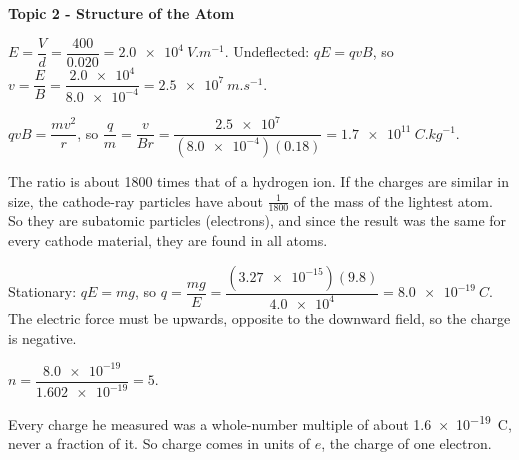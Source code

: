 \documentclass[12pt]{article}
\newcommand\anstopic[1]{\par\Needspace{8\baselineskip}\vspace{4mm}%
  \begin{center}{\headfont\bfseries\fontsize{14}{18}\selectfont #1\par}\end{center}\vspace{2pt}}
\begin{document}
\anstopic{Topic 2 - Structure of the Atom}

\ansq
{}
\begin{crit}
\end{crit}
\sample
$E = \dfrac{V}{d} = \dfrac{400}{0.020} = \qty{2.0e4}{V.m^{-1}}$. Undeflected: $qE = qvB$, so
$v = \dfrac{E}{B} = \dfrac{\num{2.0e4}}{\num{8.0e-4}} = \qty{2.5e7}{m.s^{-1}}$.
\begin{crit}
\end{crit}
\sample
$qvB = \dfrac{mv^2}{r}$, so $\dfrac{q}{m} = \dfrac{v}{Br} = \dfrac{\num{2.5e7}}{(\num{8.0e-4})(0.18)}
= \qty{1.7e11}{C.kg^{-1}}$.
\begin{crit}
\end{crit}
\sample
The ratio is about 1800 times that of a hydrogen ion. If the charges are similar in size, the cathode-ray
particles have about $\frac{1}{1800}$ of the mass of the lightest atom. So they are subatomic particles
(electrons), and since the result was the same for every cathode material, they are found in all atoms.

\ansq
{}
\begin{crit}
\end{crit}
\sample
Stationary: $qE = mg$, so $q = \dfrac{mg}{E} = \dfrac{(\num{3.27e-15})(9.8)}{\num{4.0e4}} = \qty{8.0e-19}{C}$.
The electric force must be upwards, opposite to the downward field, so the charge is negative.
\begin{crit}
\end{crit}
\sample
$n = \dfrac{\num{8.0e-19}}{\num{1.602e-19}} = 5$.
\begin{crit}
\end{crit}
\sample
Every charge he measured was a whole-number multiple of about \qty{1.6e-19}{C}, never a fraction of it.
So charge comes in units of $e$, the charge of one electron.
\end{document}
